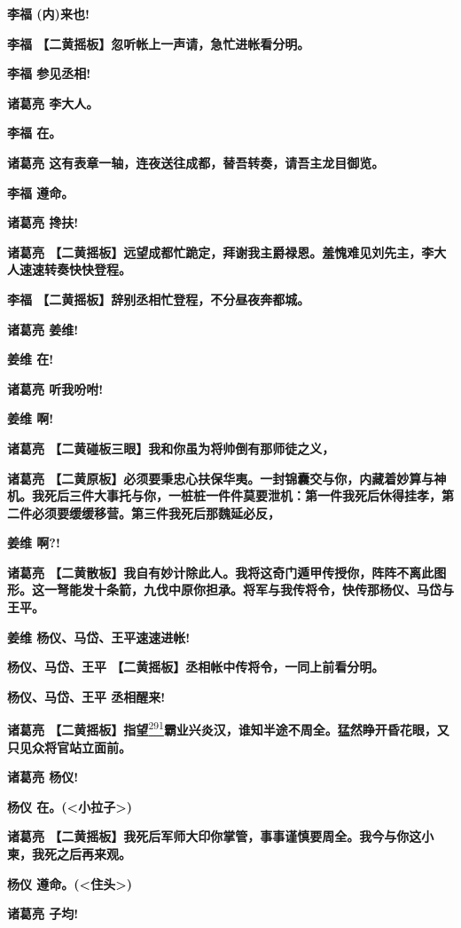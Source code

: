 \textbf{李福 (内)来也!}

\textbf{李福 【二黄摇板】忽听帐上一声请，急忙进帐看分明。}

\textbf{李福 参见丞相!}

\textbf{诸葛亮 李大人。}

\textbf{李福 在。}

\textbf{诸葛亮 这有表章一轴，连夜送往成都，替吾转奏，请吾主龙目御览。}

\textbf{李福 遵命。}

\textbf{诸葛亮 搀扶!}

\textbf{诸葛亮
【二黄摇板】远望成都忙跪定，拜谢我主爵禄恩。羞愧难见刘先主，李大人速速转奏快快登程。}

\textbf{李福 【二黄摇板】辞别丞相忙登程，不分昼夜奔都城。}

\textbf{诸葛亮 姜维!}

\textbf{姜维 在!}

\textbf{诸葛亮 听我吩咐!}

\textbf{姜维 啊!}

\textbf{诸葛亮 【二黄碰板三眼】我和你虽为将帅倒有那师徒之义，}

\textbf{诸葛亮
【二黄原板】必须要秉忠心扶保华夷。一封锦囊交与你，内藏着妙算与神机。我死后三件大事托与你，一桩桩一件件莫要泄机：第一件我死后休得挂孝，第二件必须要缓缓移营。第三件我死后那魏延必反，}

\textbf{姜维 啊?!}

\textbf{诸葛亮
【二黄散板】我自有妙计除此人。我将这奇门遁甲传授你，阵阵不离此图形。这一弩能发十条箭，九伐中原你担承。将军与我传将令，快传那杨仪、马岱与王平。}

\textbf{姜维 杨仪、马岱、王平速速进帐!}

\textbf{杨仪、马岱、王平 【二黄摇板】丞相帐中传将令，一同上前看分明。}

\textbf{杨仪、马岱、王平 丞相醒来!}

\textbf{诸葛亮
【二黄摇板】指望}\protect\hyperlink{fn291}{\textsuperscript{291}}\textbf{霸业兴炎汉，谁知半途不周全。猛然睁开昏花眼，又只见众将官站立面前。}

\textbf{诸葛亮 杨仪!}

\textbf{杨仪 在。(\textless{}小拉子\textgreater{})}

\textbf{诸葛亮
【二黄摇板】我死后军师大印你掌管，事事谨慎要周全。我今与你这小柬，我死之后再来观。}

\textbf{杨仪 遵命。(\textless{}住头\textgreater{})}

\textbf{诸葛亮 子均!}

